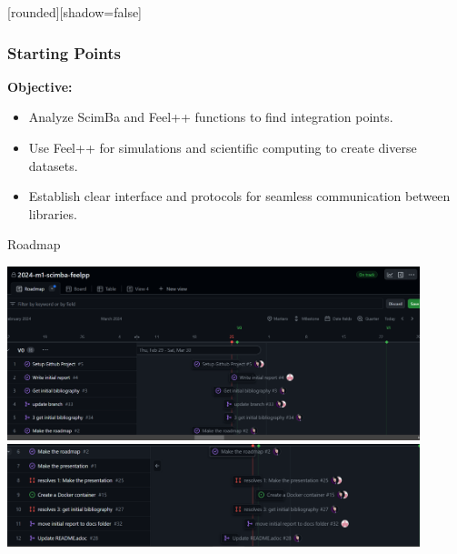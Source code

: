 \documentclass[10pt]{beamer}
\begin{document}

\begin{frame}
    [rounded][shadow=false]
    \frametitle{Starting Points}
    \textbf{Objective:}


    \begin{itemize}
        \item Analyze ScimBa and Feel++ functions to find integration points.
        

        \item Use Feel++ for simulations and scientific computing to create diverse datasets.
        

        \item Establish clear interface and protocols for seamless communication between libraries.
        
        
    \end{itemize}   

\end{frame}



\begin{frame}{Roadmap}
    \begin{center}
        \includegraphics[width=0.9\textwidth]{images/roadmap1.png}
        \vspace{1em} %
        \includegraphics[width=0.9\textwidth]{images/roadmap2.png}
    \end{center}
\end{frame}
\end{document}
